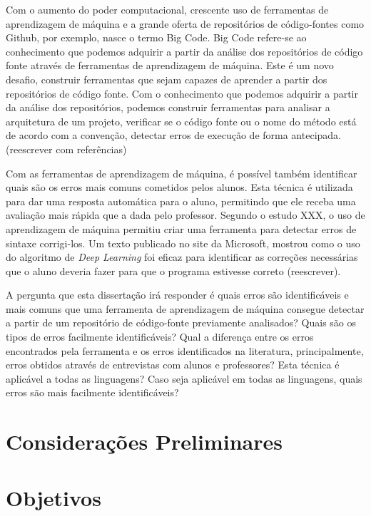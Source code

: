 Com o aumento do poder computacional, crescente uso de ferramentas de aprendizagem de máquina e a grande oferta de repositórios de código-fontes como Github, por exemplo, nasce o termo Big Code. Big Code refere-se ao conhecimento que podemos adquirir a partir da análise dos repositórios de código fonte através de ferramentas de aprendizagem de máquina. Este é um novo desafio, construir ferramentas que sejam capazes de aprender a partir dos repositórios de código fonte. Com o conhecimento que podemos adquirir a partir da análise dos repositórios, podemos construir ferramentas para analisar a arquitetura de um projeto, verificar se o código fonte ou o nome do método está de acordo com a convenção, detectar erros de execução de forma antecipada. (reescrever com referências)

Com as ferramentas de aprendizagem de máquina, é possível também identificar quais são os erros mais comuns cometidos pelos alunos. Esta técnica é utilizada para dar uma resposta automática para o aluno, permitindo que ele receba uma avaliação mais rápida que a dada pelo professor. Segundo o estudo XXX, o uso de aprendizagem de máquina permitiu criar uma ferramenta para detectar erros de sintaxe corrigi-los. Um texto publicado no site da Microsoft, mostrou como o uso do algoritmo de \textit{Deep Learning} foi eficaz para identificar as correções necessárias que o aluno deveria fazer para que o programa estivesse correto (reescrever).

A pergunta que esta dissertação irá responder é quais erros são identificáveis e mais comuns que uma ferramenta de aprendizagem de máquina consegue detectar a partir de um repositório de código-fonte previamente analisados? Quais são os tipos de erros facilmente identificáveis? Qual a diferença entre os erros encontrados pela ferramenta e os erros identificados na literatura, principalmente, erros obtidos através de entrevistas com alunos e professores? Esta técnica é aplicável a todas as linguagens? Caso seja aplicável em todas as linguagens, quais erros são mais facilmente identificáveis?


\section{Considerações Preliminares}
\label{sec:consideracoes_preliminares}



 

\section{Objetivos}
\label{sec:objetivo}

